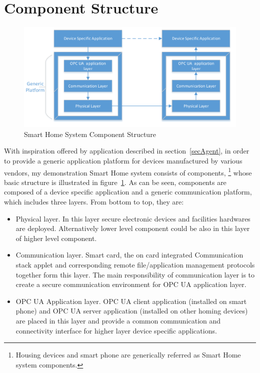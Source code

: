 \section {Component Structure}
 \begin{figure}[!htb]
	\centering
	\includegraphics[width=1.1\textwidth]{component}
		\caption{Smart Home System Component Structure}
	\label{fig:SmartHomeComponent}
\end{figure}
With inspiration offered by application described in section~\ref{secAgent}, in order to provide a generic application platform for devices manufactured by various vendors, my demonstration Smart Home system consists of components, \footnote{Housing devices and smart phone are generically referred as Smart Home system components.} whose basic structure is illustrated in figure~\ref{fig:SmartHomeComponent}.  As can be seen, components are composed of a device specific application and a generic communication platform, which includes three layers. From bottom to top, they are:

\begin{itemize}
\item Physical layer. In this layer secure electronic devices and facilities hardwares are deployed. Alternatively lower level component could be also in this layer of higher level component.
\item Communication layer. Smart card, the on card integrated Communication stack applet and corresponding remote file/application management protocols together form this layer. The main responsibility of communication layer is to create a secure communication environment for OPC UA application layer.
\item OPC UA Application layer. OPC UA client application (installed on smart phone) and OPC UA server application (installed on other homing devices) are placed in this layer and provide a common communication and connectivity interface for higher layer device specific applications. 
\end{itemize}

